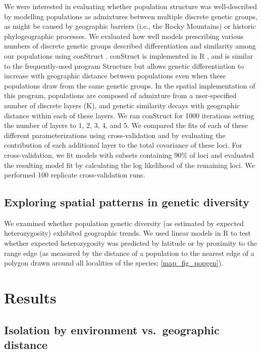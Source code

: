 \documentclass{article}
\begin{document}
We were interested in evaluating whether population structure was well-described by modelling populations as admixtures between multiple discrete genetic groups, as might be caused by geographic barriers (i.e., the Rocky Mountains) or historic phylogeographic processes. We evaluated how well models prescribing various numbers of discrete genetic groups described differentiation and similarity among our populations using conStruct \citep{bradburd2017inferring}. conStruct is implemented in R \citep{Rcore}, and is similar to the frequently-used program Structure \citep{pritchard2000inference} but allows genetic differentiation to increase with geographic distance between populations even when these populations draw from the same genetic groups. In the spatial implementation of this program, populations are composed of admixture from a user-specified number of discrete layers (K), and genetic similarity decays with geographic distance within each of these layers. We ran conStruct for 1000 iterations setting the number of layers to 1, 2, 3, 4, and 5. We compared the fits of each of these different parameterizations using cross-validation and by evaluating the contribution of each additional layer to the total covariance of these loci. For cross-validation, we fit models with subsets containing 90\% of loci and evaluated the resulting model fit by calculating the log likelihood of the remaining loci. We performed 100 replicate cross-validation runs. 

\subsection*{Exploring spatial patterns in genetic diversity}

We examined whether population genetic diversity (as estimated by expected heterozygosity) exhibited geographic trends. We used linear models in R \citep{Rcore} to test whether expected heterozygosity was predicted by latitude or by proximity to the range edge (as measured by the distance of a population to the nearest edge of a polygon drawn around all localities of the species; \autoref{map_fig_popgen}). 

\section*{Results}
\subsection*{Isolation by environment vs.\ geographic distance}
\end{document}
